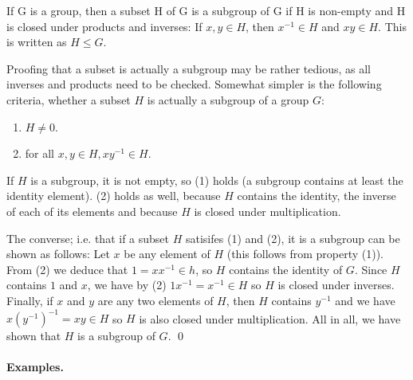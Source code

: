 

\begin{definition}[Subgroup]
  If G is a group, then a subset H of G is a subgroup of G if H is non-empty and H is closed under products and inverses: If $x,y \in H$, then $x^{-1} \in H$ and $xy \in H$. This is written as $H \leq G$.
\end{definition}

Proofing that a subset is actually a subgroup may be rather tedious, as all inverses and products need to be checked. Somewhat simpler is the following criteria, whether a subset $H$ is actually a subgroup of a group $G$:

\begin{enumerate}
    \item $H \neq 0$.
    \item for all $x,y \in H, xy^{-1} \in H$.
\end{enumerate}

If $H$ is a subgroup, it is not empty, so (1) holds (a subgroup contains at least the identity element). (2) holds as well, because $H$ contains the identity, the inverse of each of its elements and because $H$ is closed under multiplication.

The converse; i.e. that if a subset $H$ satisifes (1) and (2), it is a subgroup can be shown as follows: Let $x$ be any element of $H$ (this follows from property (1)). From (2) we deduce that $1 = xx^{-1} \in h$, so $H$ contains the identity of $G$. Since $H$ contains $1$ and $x$, we have by (2) $1 x^{-1} = x^{-1} \in H$ so $H$ is closed under inverses. Finally, if $x$ and $y$ are any two elements of $H$, then $H$ contains $y^{-1}$ and we have $x(y^{-1})^{-1} = xy \in H$ so $H$ is also closed under multiplication. All in all, we have shown that $H$ is a subgroup of $G$. \qed


\paragraph{Examples.}

